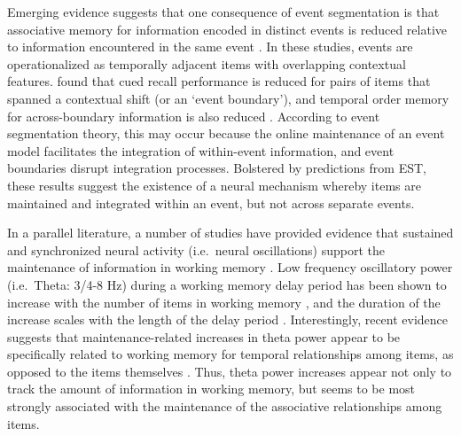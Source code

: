 Emerging evidence suggests that one consequence of event segmentation is
that associative memory for information encoded in distinct events is
reduced relative to information encountered in the same event
\autocites{ezzyat_what_2011}{dubrow_influence_2013}. In these studies,
events are operationalized as temporally adjacent items with overlapping
contextual features. \textcite{ezzyat_what_2011} found that cued recall
performance is reduced for pairs of items that spanned a contextual
shift (or an `event boundary'), and temporal order memory for
across-boundary information is also reduced
\autocite{dubrow_influence_2013}. According to event segmentation
theory, this may occur because the online maintenance of an event model
facilitates the integration of within-event information, and event
boundaries disrupt integration processes. Bolstered by predictions from
EST, these results suggest the existence of a neural mechanism whereby
items are maintained and integrated within an event, but not across
separate events.

In a parallel literature, a number of studies have provided evidence
that sustained and synchronized neural activity (i.e.~neural
oscillations) support the maintenance of information in working memory
\autocites{jensen_frontal_2002}{raghavachari_gating_2001}{hsieh_neural_2011}.
Low frequency oscillatory power (i.e.~Theta: 3/4-8 Hz) during a working
memory delay period has been shown to increase with the number of items
in working memory
\autocites{jensen_frontal_2002}{scheeringa_trial-by-trial_2009}{gevins_high-resolution_1997}{raghavachari_theta_2006},
and the duration of the increase scales with the length of the delay
period \autocite{raghavachari_gating_2001}. Interestingly, recent
evidence suggests that maintenance-related increases in theta power
appear to be specifically related to working memory for temporal
relationships among items, as opposed to the items themselves
\autocite{hsieh_neural_2011}. Thus, theta power increases appear not
only to track the amount of information in working memory, but seems to
be most strongly associated with the maintenance of the associative
relationships among items.

